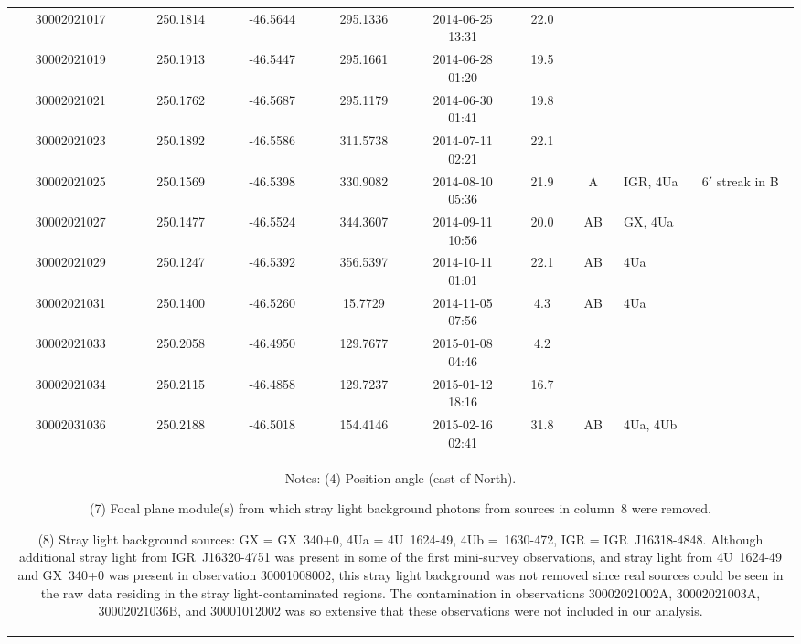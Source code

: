 \documentclass[iop,revtex4]{emulateapj}
\newcommand\T{\rule{0pt}{2.6ex}}       %
\begin{document}
{\begin{longtable}{cccccccp{0.6in}p{1.2in}}
30002021017&250.1814&-46.5644&295.1336&2014-06-25 13:31&22.0&&&\\
30002021019&250.1913&-46.5447&295.1661&2014-06-28 01:20&19.5&&&\\
30002021021&250.1762&-46.5687&295.1179&2014-06-30 01:41&19.8&&&\\
30002021023&250.1892&-46.5586&311.5738&2014-07-11 02:21&22.1&&&\\
30002021025&250.1569&-46.5398&330.9082&2014-08-10 05:36&21.9&A&IGR, 4Ua&6$'$ streak in B\\
30002021027&250.1477&-46.5524&344.3607&2014-09-11 10:56&20.0&AB&GX, 4Ua&\\
30002021029&250.1247&-46.5392&356.5397&2014-10-11 01:01&22.1&AB&4Ua&\\
30002021031&250.1400&-46.5260&15.7729&2014-11-05 07:56&4.3&AB&4Ua&\\
30002021033&250.2058&-46.4950&129.7677&2015-01-08 04:46&4.2&&&\\
30002021034&250.2115&-46.4858&129.7237&2015-01-12 18:16&16.7&&&\\
30002031036&250.2188&-46.5018&154.4146&2015-02-16 02:41&31.8&AB&4Ua, 4Ub&\\
\hline \hline

\multicolumn{9}{p{6.0in}}{\T Notes: (4) Position angle (east of North). 

(7) Focal plane module(s) from which stray light background photons from sources in column~8 were removed. 

(8) Stray light background sources: GX = GX~340+0, 4Ua = 4U~1624-49, 4Ub =~1630-472, IGR = IGR~J16318-4848.  Although additional stray light from IGR~J16320-4751 was present in some of the first mini-survey observations, and stray light from 4U~1624-49 and GX~340+0 was present in observation 30001008002, this stray light background was not removed since real sources could be seen in the raw data residing in the stray light-contaminated regions.  The contamination in observations 30002021002A, 30002021003A, 30002021036B, and 30001012002 was so extensive that these observations were not included in our analysis. }
\label{tab:obs}
\end{longtable}}
\end{document}
